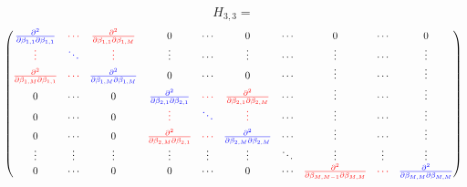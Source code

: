 \documentclass[11pt]{book}
\begin{document}
$$ H_{3,3} = $$
\begin{equation}
\begin{pmatrix}
\textcolor{blue}{\frac{\partial^2 } {\partial \beta_{1,1} \partial \beta_{1,1} }          } 
&
 \textcolor{red}{\cdots }
& 
 \textcolor{red}{\frac{\partial^2 }{\partial \beta_{1,1} \partial \beta_{1,M} } } 
&
0 & \cdots & 0 & 
\cdots & 0 & 
 \cdots 
&
  0      
\\%
\textcolor{red}{\vdots  }     &  \textcolor{blue}{\ddots }  & \textcolor{red}{\vdots} & \vdots & \cdots & \vdots   & \cdots & \vdots & \cdots & \vdots  
\\%
\textcolor{red}{\frac{\partial^2 }{\partial \beta_{1,M} \partial \beta_{1,1} } } & 
\textcolor{red}{\cdots}  & 
\textcolor{blue}{\frac{\partial^2 }{\partial \beta_{1,M} \partial \beta_{1,M} }} & 
 0 & \cdots & 0 & \cdots   & \vdots & \cdots & \vdots     
\\%
0  & 
\cdots & 0 & 
\textcolor{blue}{\frac{\partial^2 } {\partial \beta_{2,1} \partial \beta_{2,1} }} &
\textcolor{red}{\cdots} & 
\textcolor{red}{\frac{\partial^2 } {\partial \beta_{2,1} \partial \beta_{2,M} }}      & 
\cdots & \vdots & \cdots & \vdots
\\%
0  & 
\cdots & 0 & 
\textcolor{red}{\vdots} &
\textcolor{blue}{\ddots }& 
\textcolor{red}{\vdots } & 
\cdots & \vdots & \cdots & \vdots
\\ %
0 &
\cdots & 0 & 
\textcolor{red}{\frac{\partial^2 } {\partial \beta_{2,M} \partial \beta_{2,1} }} &
\textcolor{red}{\cdots} & 
\textcolor{blue}{\frac{\partial^2 } {\partial \beta_{2,M} \partial \beta_{2,M} }}      & 
\cdots & \vdots & \cdots & \vdots
\\ %
\vdots    &
\vdots & 
\vdots      & 
\vdots & \vdots & \vdots & \ddots &
\vdots & 
\vdots & 
\vdots
\\ %
0      & 
\cdots & 
0      & 
0 & 
\cdots & 
0  & \cdots &
\textcolor{red}{\frac{\partial^2 } {\partial \beta_{M,M-1} \partial \beta_{M,M} }} &
\textcolor{red}{\cdots} & 
\textcolor{blue}{\frac{\partial^2 } {\partial \beta_{M,M} \partial \beta_{M,M} }}
\end{pmatrix}
\end{equation}
\end{document}
